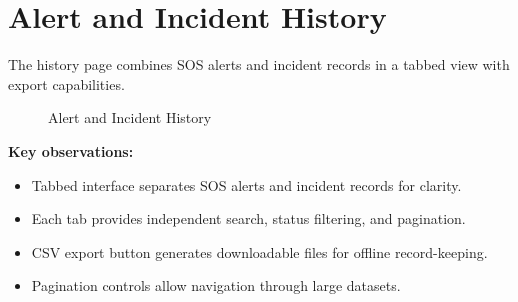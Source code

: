 \section{Alert and Incident History}

The history page combines SOS alerts and incident records in a tabbed view with export capabilities.

\begin{figure}[H]
  \centering
  \begin{minipage}{0.45\textwidth}
    \centering
  \end{minipage}
  \hfill
  \begin{minipage}{0.45\textwidth}
    \centering
  \end{minipage}
  \caption{Alert and Incident History}
  \label{fig:screenshot-history}
\end{figure}

\textbf{Key observations:}
\begin{itemize}
  \item Tabbed interface separates SOS alerts and incident records for clarity.
  \item Each tab provides independent search, status filtering, and pagination.
  \item CSV export button generates downloadable files for offline record-keeping.
  \item Pagination controls allow navigation through large datasets.
\end{itemize}

